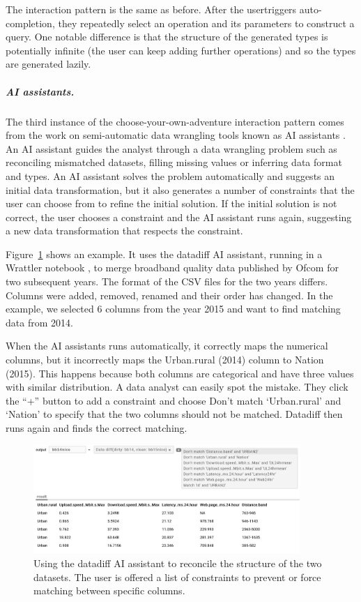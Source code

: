 \documentclass[a4paper,UKenglish,cleveref, autoref, thm-restate]{lipics-v2021}
\newcommand{\ident}[1]{\textsf{#1}}
\begin{document}
The interaction pattern is the same as before. After the usertriggers auto-completion, they
repeatedly select an operation and its parameters to construct a query. One notable difference
is that the structure of the generated types is potentially infinite (the user can keep adding
further operations) and so the types are generated lazily.

\subparagraph{AI assistants.}

The third instance of the choose-your-own-adventure interaction pattern comes from the work on
semi-automatic data wrangling tools known as AI assistants \cite{petricek-2023-aias}.
An AI assistant guides the analyst through a data wrangling problem such as reconciling mismatched
datasets, filling missing values or inferring data format and types. An AI assistant solves
the problem automatically and suggests an initial data transformation, but it also generates a
number of constraints that the user can choose from to refine the initial solution. If the initial
solution is not correct, the user chooses a constraint and the AI assistant runs again, suggesting
a new data transformation that respects the constraint.

Figure~\ref{fig:aia} shows an example. It uses the datadiff \cite{sutton-2018-datadiff} AI
assistant, running in a Wrattler notebook \cite{petricek-2018-wrattler}, to merge broadband
quality data published by Ofcom for two subsequent years. The format of the CSV files for the
two years differs. Columns were added, removed, renamed and their order has changed. In the
example, we selected 6 columns from the year 2015 and want to find matching data from 2014.

When the AI assistants runs automatically, it correctly maps the numerical columns, but it
incorrectly maps the \ident{Urban.rural} (2014) column to \ident{Nation} (2015). This happens
because both columns are categorical and have three values with similar distribution. A data
analyst can easily spot the mistake. They click the ``+'' button to add a constraint and choose
\ident{Don't match `Urban.rural' and `Nation'} to specify that the two columns should not be matched.
Datadiff then runs again and finds the correct matching.

\begin{figure}[t]
  \includegraphics[width=0.9\textwidth]{fig/aia.png}
  \caption{Using the datadiff AI assistant to reconcile the structure of the two datasets.
    The user is offered a list of constraints to prevent or force matching between specific columns.}
  \label{fig:aia}
\end{figure}
\end{document}

